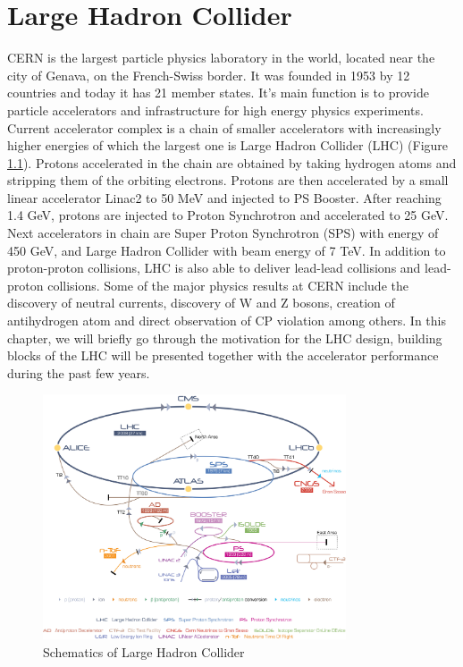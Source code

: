 
\chapter{Large Hadron Collider} %

\label{Chapter3} %


CERN is the largest particle physics laboratory in the world, located near the city of Genava, on the French-Swiss border. It was founded in 1953 by 12 countries and today it has 21 member states. It's main function is to provide particle accelerators and infrastructure for high energy physics experiments. Current accelerator complex is a chain of smaller accelerators with increasingly higher energies of which the largest one is Large Hadron Collider (LHC) (Figure \ref{fig:LHC}). Protons accelerated in the chain are obtained by taking hydrogen atoms and stripping them of the orbiting electrons. Protons are then accelerated by a small linear accelerator Linac2 to 50 MeV and injected to PS Booster. After reaching 1.4 GeV, protons are injected to Proton Synchrotron and accelerated to 25 GeV. Next accelerators in chain are Super Proton Synchrotron (SPS) with energy of 450 GeV, and Large Hadron Collider with beam energy of 7 TeV. In addition to proton-proton collisions, LHC is also able to deliver lead-lead collisions and lead-proton collisions. 
Some of the major physics results at CERN include the discovery of neutral currents, discovery of W and Z bosons, creation of antihydrogen atom and direct observation of CP violation among others. 
In this chapter, we will briefly go through the motivation for the LHC design, building blocks of the LHC will be presented together with the accelerator performance during the past few years.   
\begin{figure}[htbp]
	\centering
		\includegraphics[width=0.8\textwidth]{Figures/LHC.jpg}
	\caption[Schematics of Large Hadron Collider]{Schematics of Large Hadron Collider}
	\label{fig:LHC}
\end{figure}
